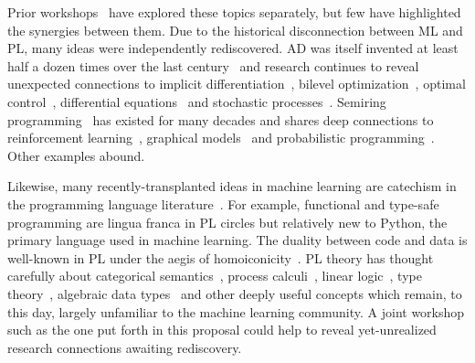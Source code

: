 \documentclass{article}
\begin{document}
    Prior workshops~\cite{wermter2001present, ad2017, ptml2019, lafi2019, cap2020} have explored these topics separately, but few have highlighted the synergies between them. Due to the historical disconnection between ML and PL, many ideas were independently rediscovered. AD was itself invented at least half a dozen times over the last century~\cite{baydin2018automatic} and research continues to reveal unexpected connections to implicit differentiation~\cite{christianson1998reverse}, bilevel optimization~\cite{stadie2020learning}, optimal control~\cite{nikishin2021control}, differential equations~\cite{chen2018neural} and stochastic processes~\cite{li2020scalable}.  Semiring programming~\cite{gondran2008graphs} has existed for many decades and shares deep connections to reinforcement learning~\cite{baras2010path}, graphical models~\cite{ravanbakhsh2014revisiting} and probabilistic programming~\cite{belle2020semiring}. Other examples abound.

    Likewise, many recently-transplanted ideas in machine learning are catechism in the programming language literature~\citep{church1941calculi}.  For example, functional and type-safe programming are lingua franca in PL circles but relatively new to Python, the primary language used in machine learning.  The duality between code and data is well-known in PL under the aegis of homoiconicity~\cite{abelson1996structure}. PL theory has thought carefully about categorical semantics~\cite{barr1990category}, process calculi~\cite{blute1997bisimulation}, linear logic~\cite{girard1987linear}, type theory~\cite{martin1984intuitionistic}, algebraic data types~\cite{johann2008foundations} and other deeply useful concepts which remain, to this day, largely unfamiliar to the machine learning community. A joint workshop such as the one put forth in this proposal could help to reveal yet-unrealized research connections awaiting rediscovery.

    \pagebreak
\end{document}
